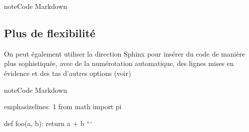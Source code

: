\documentclass[a4,10pt,french]{sphinxmanual}
\begin{document}
\begin{sphinxadmonition}{note}{Code Markdown}

\begin{sphinxVerbatim}[commandchars=\\\{\}]
   

  
       

 
\end{sphinxVerbatim}
\end{sphinxadmonition}


\subsection{Plus de flexibilité}
\label{\detokenize{tutoriel-sphinx/inserer-code:plus-de-flexibilite}}
\sphinxAtStartPar
On peut également utiliser la direction Sphinx  pour insérer du code de manière plus sophistiquée, avec de la numérotation automatique, des lignes mises en évidence et des tas d’autres options (voir)

%
\begin{sphinxVerbatim}[commandchars=\\\{\},numbers=left,firstnumber=1,stepnumber=1]
   

  
       
\end{sphinxVerbatim}
\sphinxresetverbatimhllines

\begin{sphinxadmonition}{note}{Code Markdown}

\begin{sphinxVerbatim}[commandchars=\\\{\}]
emphasize\PYGZhy{}lines: 1
from math import pi

def foo(a, b):
    return a + b
```
\end{sphinxVerbatim}
\end{sphinxadmonition}
\end{document}
